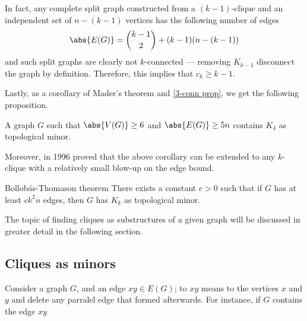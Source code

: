 \documentclass[a4paper, 12pt]{report}
\begin{document}
    In fact, any complete split graph constructed from a $(k - 1)$-clique and an independent set of $n - (k - 1)$ vertices has the following number of edges $$\abs{E(G)} = \binom{k - 1}{2} +  (k - 1)(n - (k - 1))$$ and such split graphs are clearly not $k$-connected --- removing $K_{k - 1}$ disconnect the graph by definition. Therefore, this implies that $c_k \ge k - 1$.

    Lastly, as a corollary of Mader's theorem and \cref{3-conn prop}, we get the following proposition.

    \begin{framedcor}{}
        A graph $G$ such that $\abs{V(G)} \ge 6$ and $\abs{E(G)} \ge 5n$ contains $K_4$ as topological minor.
    \end{framedcor}

    Moreover, in 1996 \textcite{bollobas} proved that the above corollary can be extended to any $k$-clique with a relatively small blow-up on the edge bound.

    \begin{framedthm}{Bollobás-Thomason theorem}
        There exists a constant $c > 0$ such that if $G$ has at least $ck^2n$ edges, then $G$ has $K_k$ as topological minor.
    \end{framedthm}

    The topic of finding cliques as substructures of a given graph will be discussed in greater detail in the following section.

    \subsection{Cliques as minors}

    Consider a graph $G$, and an edge $xy \in E(G)$; to  $xy$ means to  the vertices $x$ and $y$ and delete any parralel edge that formed afterwards. For instance, if $G$ contains the edge $xy$

    \begin{figure}[H]
        \centering
    \end{figure}
\end{document}

